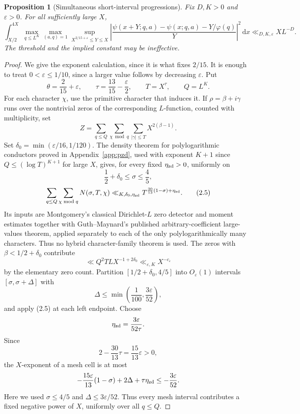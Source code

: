 \documentclass[11pt]{article}
\newtheorem{proposition}[theorem]{Proposition}
\theoremstyle{remark}
\newcommand{\eps}{\varepsilon}
\newcommand{\1}{\mathbf 1}
\newcommand{\dd}{\,\mathrm d}
\begin{document}
\begin{proposition}[Simultaneous short-interval progressions]\label{prop:ap}
Fix $D,K>0$ and $\eps>0$.  For all sufficiently large $X$,
\[
 \int_{X/2}^{4X}\max_{q\le L^K}\max_{(a,q)=1}
 \sup_{X^{2/15+\eps}\le Y\le X}
 \left|\frac{\psi(x+Y;q,a)-\psi(x;q,a)-Y/\varphi(q)}Y\right|^2\dd x
 \ll_{D,K,\eps}XL^{-D}.                                \tag{2.4}
\]
The threshold and the implied constant may be ineffective.
\end{proposition}

\begin{proof}
We give the exponent calculation, since it is what fixes $2/15$. It is enough
to treat $0<\eps\le1/10$, since a larger value follows by decreasing $\eps$.
Put
\[
 \theta=\frac2{15}+\eps,\qquad
 \tau=\frac{13}{15}-\frac\eps2,\qquad T=X^\tau,\qquad Q=L^K.
\]
For each character \(\chi\), use the primitive character that induces it.
If \(\rho=\beta+i\gamma\) runs over the nontrivial zeros of the corresponding
\(L\)-function, counted with multiplicity, set
\[
 Z=\sum_{q\le Q}\sum_{\chi\bmod q}\sum_{|\gamma|\le T}X^{2(\beta-1)}.
\]
Set $\delta_0=\min(\eps/16,1/120)$. The density theorem for
polylogarithmic conductors proved in
Appendix~\ref{app:pzd}, used with exponent $K+1$ since
$Q\le(\log T)^{K+1}$ for large $X$, gives, for every fixed
$\eta_{\rm zd}>0$, uniformly on
\[
 \frac12+\delta_0\le\sigma\le\frac45,
\]
\[
 \sum_{q\le Q}\sum_{\chi\bmod q}N(\sigma,T,\chi)
 \ll_{K,\delta_0,\eta_{\rm zd}}
 T^{\frac{30}{13}(1-\sigma)+\eta_{\rm zd}}.          \tag{2.5}
\]
Its inputs are Montgomery's classical Dirichlet-$L$ zero detector and moment
estimates together with Guth--Maynard's published arbitrary-coefficient
large-values theorem, applied separately to each of the only polylogarithmically
many characters.  Thus no hybrid character-family theorem is used. The zeros with
$\beta<1/2+\delta_0$ contribute
\[
 \ll Q^2T L X^{-1+2\delta_0}\ll_{\eps,K}X^{-c_\eps}
\]
by the elementary zero count.  Partition
$[1/2+\delta_0,4/5]$ into $O_\eps(1)$ intervals
$[\sigma,\sigma+\Delta]$ with
\[
 \Delta\le\min\!\left(\frac1{100},\frac{3\eps}{52}\right),
\]
and apply (2.5) at each left endpoint. Choose
\[
 \eta_{\rm zd}=\frac{3\eps}{52\tau}.
\]
Since
\[
 2-\frac{30}{13}\tau=\frac{15}{13}\eps>0,
\]
the $X$-exponent of a mesh cell is at most
\[
 -\frac{15\eps}{13}(1-\sigma)+2\Delta+\tau\eta_{\rm zd}
 \le-\frac{3\eps}{52}.
\]
Here we used $\sigma\le4/5$ and
$\Delta\le3\eps/52$. Thus every mesh interval contributes a fixed negative
power of $X$, uniformly over all $q\le Q$.


\end{proof}
\end{document}
